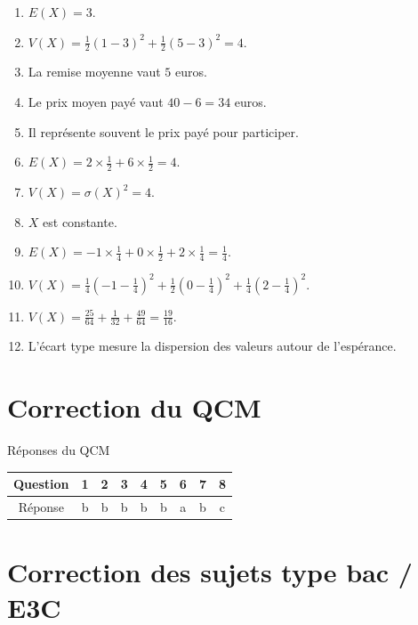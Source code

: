 \documentclass[11pt,a4paper]{article}
\newcounter{reponse}
\newenvironment{blocreponses}[1]{%
  \begin{tcolorbox}[enhanced,breakable,colback=bleuclair,colframe=bleufonce,boxrule=0.6pt,arc=2mm,left=2mm,right=2mm,top=2mm,bottom=1.5mm,title={\bfseries #1},coltitle=white,colbacktitle=bleufonce,before skip=3mm,after skip=3mm, fontupper=\large]
  \large
  \begin{enumerate}[leftmargin=*,label=\textbf{\arabic*.},itemsep=0.42em,topsep=0.5em]
  \setcounter{enumi}{\value{reponse}}
}{%
  \setcounter{reponse}{\value{enumi}}
  \end{enumerate}
  \end{tcolorbox}
}
\begin{document}
\begin{blocreponses}{Réponses 25 à 36}
\item $E(X)=3$.
\item $V(X)=\frac12(1-3)^2+\frac12(5-3)^2=4$.
\item La remise moyenne vaut $5$ euros.
\item Le prix moyen payé vaut $40-6=34$ euros.
\item Il représente souvent le prix payé pour participer.
\item $E(X)=2\times\frac12+6\times\frac12=4$.
\item $V(X)=\sigma(X)^2=4$.
\item $X$ est constante.
\item $E(X)=-1\times\frac14+0\times\frac12+2\times\frac14=\frac14$.
\item $V(X)=\frac14\left(-1-\frac14\right)^2+\frac12\left(0-\frac14\right)^2+\frac14\left(2-\frac14\right)^2$.
\item $V(X)=\frac{25}{64}+\frac{1}{32}+\frac{49}{64}=\frac{19}{16}$.
\item L'écart type mesure la dispersion des valeurs autour de l'espérance.
\end{blocreponses}

\section{Correction du QCM}
\begin{correctionbox}{Réponses du QCM}
\begin{center}
\begin{tabular}{c|cccccccc}
Question & 1&2&3&4&5&6&7&8\\\hline
Réponse & b&b&b&b&b&a&b&c
\end{tabular}
\end{center}
\end{correctionbox}

\section{Correction des sujets type bac / E3C}
\end{document}
